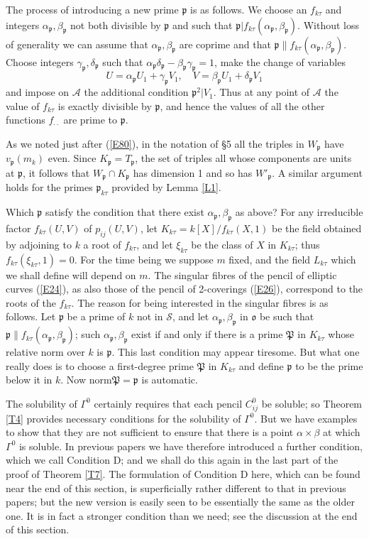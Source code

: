 \documentclass[12pt]{article}
\def\fo{{\mathfrak o}}
\def\fp{{\mathfrak p}}
\def\fP{{\mathfrak P}}
\def\ga{{\alpha}}
\def\gb{{\beta}}
\def\gG{{\Gamma}}
\def\gg{{\gamma}}
\def\gd{{\delta}}
\def\sA{{\mathcal A}}
\def\sS{{\mathcal S}}
\begin{document}
The process of introducing a new prime $\fp$ is as follows. We
choose an $f_{k\tau}$ and integers $\ga_\fp,\gb_\fp$ not both
divisible by $\fp$ and such that $\fp|f_{k\tau}(\ga_\fp,\gb_\fp)$.
Without loss of generality we can assume that $\ga_\fp,\gb_\fp$
are coprime and that $\fp\|f_{k\tau}(\ga_\fp,\gb_\fp)$. Choose
integers $\gg_\fp,\gd_\fp$ such that $\ga_\fp\gd_\fp-\gb_\fp
\gg_\fp=1$, make the change of variables
\[ U=\ga_\fp U_1+\gg_\fp V_1, \quad V=\gb_\fp U_1+\gd_\fp V_1 \]
and impose on $\sA$ the additional condition $\fp^2|V_1$. Thus
at any point of $\sA$ the value of $f_{k\tau}$ is exactly
divisible by $\fp$, and hence the values of all the other
functions $f_{\cdot\cdot}$ are prime to $\fp$.

As we noted just after (\ref{E80}), in the notation of \S5 all
the triples in $W_\fp$ have $v_\fp(m_k)$ even. Since
$K_\fp=T_\fp$, the set of triples all whose components
are units at $\fp$, it follows that $W_\fp\cap K_\fp$ has
dimension 1 and so has $W'_\fp$. A similar argument holds for
the primes $\fp_{k\tau}$ provided by Lemma \ref{L1}.

Which $\fp$ satisfy the condition that there exist
$\ga_\fp,\gb_\fp$ as above?
For any irreducible factor $f_{k\tau}(U,V)$ of $p_{ij}(U,V)$,
let $K_{k\tau}=k[X]/f_{k\tau}(X,1)$ be the field obtained by
adjoining to $k$ a root of $f_{k\tau}$, and let $\xi_{k\tau}$
be the class of $X$ in $K_{k\tau}$; thus $f_{k\tau}
(\xi_{k\tau},1)=0$. For the time being we suppose $m$ fixed,
and the field $L_{k\tau}$ which we shall
define will depend on $m$. The singular fibres of the pencil
of elliptic curves (\ref{E24}), as also those
of the pencil of 2-coverings (\ref{E26}), correspond to the
roots of the $f_{k\tau}$. The reason for being interested in
the singular fibres is as follows. Let $\fp$
be a prime of $k$ not in $\sS$, and let $\ga_\fp,\gb_\fp$
in $\fo$ be such that $\fp\|f_{k\tau}
(\ga_\fp,\gb_\fp)$; such $\ga_\fp,\gb_\fp$ exist if and only
if there is a prime $\fP$ in $K_{k\tau}$ whose relative norm
over $k$ is $\fp$. This last condition may appear tiresome.
But what one really does is to choose a first-degree prime
$\fP$ in $K_{k\tau}$ and define $\fp$ to be the prime below
it in $k$. Now norm$\fP=\fp$ is automatic.

The solubility of $\gG^0$ certainly requires that each pencil $C^0_{ij}$
be soluble; so Theorem \ref{T4} provides necessary conditions for the
solubility of $\gG^0$. But we have examples to show that
they are not sufficient to ensure that there is a point $\ga\times\gb$ at which
$\gG^0$ is soluble. In previous papers we have therefore introduced a further
condition, which we call Condition D; and we shall do this again in the last
part of the proof of Theorem \ref{T7}. The formulation of
Condition D here, which can be found near the end of this
section, is superficially rather different to that in
previous papers; but the new version
is easily seen to be essentially the same as the older one.
It is in fact a stronger condition than we need;
see the discussion at the end of this section.
\end{document}
